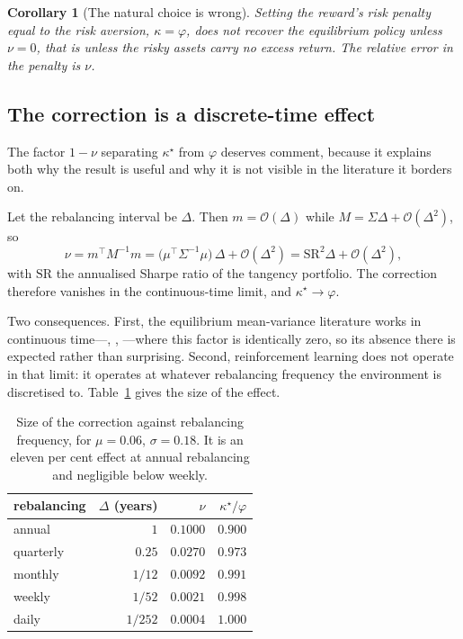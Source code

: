 \documentclass[11pt,a4paper]{article}
\theoremstyle{plain}
\newtheorem{corollary}[theorem]{Corollary}
\theoremstyle{definition}
\theoremstyle{remark}
\begin{document}
\begin{corollary}[The natural choice is wrong]
Setting the reward's risk penalty equal to the risk aversion, $\kappa=\varphi$,
does not recover the equilibrium policy unless $\nu=0$, that is unless the risky
assets carry no excess return. The relative error in the penalty is $\nu$.
\end{corollary}

\subsection{The correction is a discrete-time effect}\label{sec:ct}

The factor $1-\nu$ separating $\kappa^{\star}$ from $\varphi$ deserves comment,
because it explains both why the result is useful and why it is not visible in
the literature it borders on.

Let the rebalancing interval be $\Delta$. Then $m=\mathcal{O}(\Delta)$ while
$M=\Sigma\Delta+\mathcal{O}(\Delta^{2})$, so
\begin{equation}
\nu=m^{\top}M^{-1}m=\bigl(\mu^{\top}\Sigma^{-1}\mu\bigr)\,\Delta+\mathcal{O}(\Delta^{2})
=\mathrm{SR}^{2}\Delta+\mathcal{O}(\Delta^{2}),
\label{eq:nuscaling}
\end{equation}
with $\mathrm{SR}$ the annualised Sharpe ratio of the tangency portfolio. The
correction therefore vanishes in the continuous-time limit, and
$\kappa^{\star}\to\varphi$.

Two consequences. First, the equilibrium mean-variance literature works in
continuous time---\citet{basak}, \citet{bjorkzhou}, \citet{wang}---where this
factor is identically zero, so its absence there is expected rather than
surprising. Second, reinforcement learning does not operate in that limit: it
operates at whatever rebalancing frequency the environment is discretised to.
Table~\ref{tab:freq} gives the size of the effect.

\begin{table}[h]\centering\small
\begin{tabular}{lrrr}
\toprule
rebalancing & $\Delta$ (years) & $\nu$ & $\kappa^{\star}/\varphi$\\
\midrule
annual & $1$ & $0.1000$ & $0.900$\\
quarterly & $0.25$ & $0.0270$ & $0.973$\\
monthly & $1/12$ & $0.0092$ & $0.991$\\
weekly & $1/52$ & $0.0021$ & $0.998$\\
daily & $1/252$ & $0.0004$ & $1.000$\\
\bottomrule
\end{tabular}
\caption{Size of the correction against rebalancing frequency, for
$\mu=0.06$, $\sigma=0.18$. It is an eleven per cent effect at annual
rebalancing and negligible below weekly.}
\label{tab:freq}
\end{table}
\end{document}
